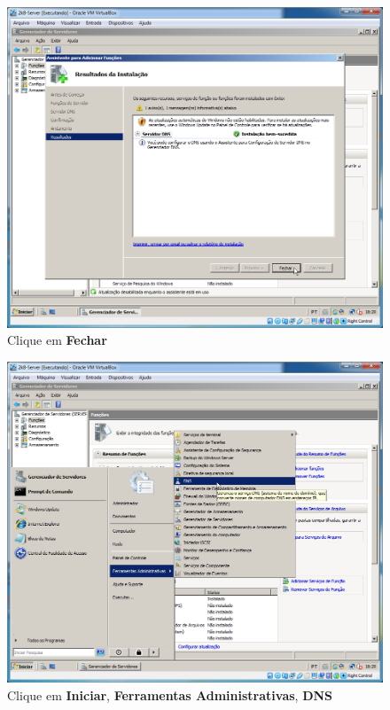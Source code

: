 \documentclass[10pt]{article}
\begin{document}
\begin{figure}[H]
    \centering
    \caption{Clique em \textbf{Fechar}}
    \label{fig:DNS010}
    \includegraphics[width=\linewidth]{images/windows_server/dns/010.png}
\end{figure}
\begin{figure}[H]
    \centering
    \caption{Clique em \textbf{Iniciar}, \textbf{Ferramentas Administrativas}, \textbf{DNS}}
    \label{fig:DNS011}
    \includegraphics[width=\linewidth]{images/windows_server/dns/011.png}
\end{figure}
\end{document}
